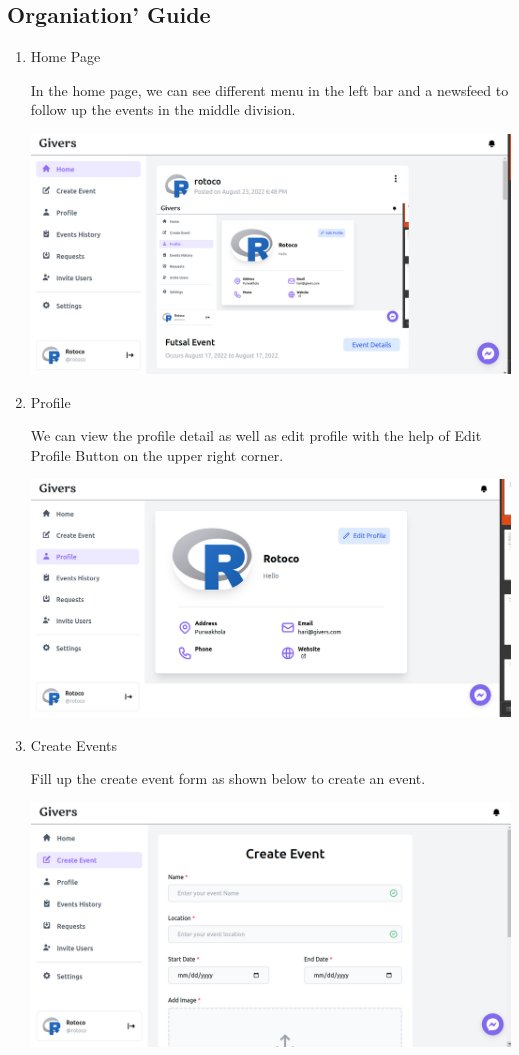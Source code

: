 \documentclass[12pt]{article}
\begin{document}
\clearpage
\clearpage

\subsection{Organiation' Guide}
\begin{enumerate}
	\item Home Page
	
	In the home page, we can see different menu in the left bar and a newsfeed to follow up the events in the middle division.
	
	\includegraphics[scale = 0.35]{user/organization_home1.png}

	\item Profile
	
	
	We can view the profile detail as well as edit profile with the help of Edit Profile Button on the upper right corner.
	
	\includegraphics[scale = 0.35]{user/profile_menu.png}

\clearpage

	\item Create Events
	
	Fill up the create event form as shown below to create an event.
	
	\includegraphics[scale = 0.35]{user/event_creation0.png}


\end{enumerate}
\end{document}
